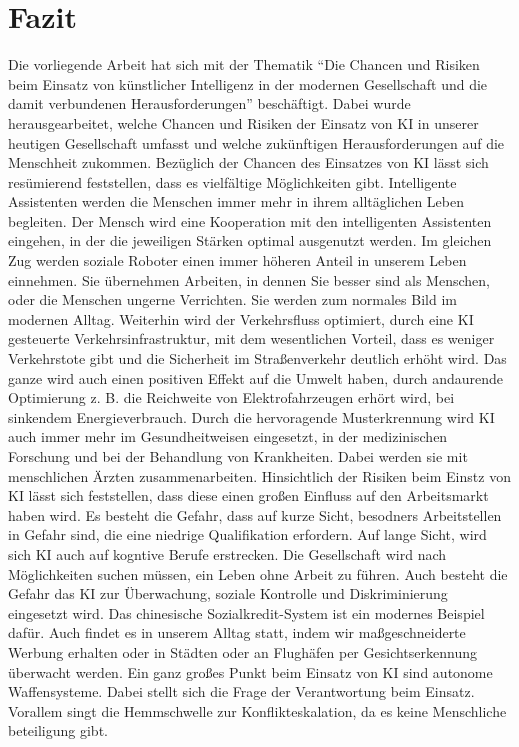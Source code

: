 \newpage
\section{Fazit}\label{Fazit}
Die vorliegende Arbeit hat sich mit der Thematik \enquote{Die Chancen und Risiken beim Einsatz von künstlicher Intelligenz in der modernen Gesellschaft und die damit verbundenen Herausforderungen}
beschäftigt. Dabei wurde herausgearbeitet, welche Chancen und Risiken der Einsatz von \ac{KI} in unserer heutigen Gesellschaft umfasst und welche zukünftigen Herausforderungen
auf die Menschheit zukommen.
Bezüglich der Chancen des Einsatzes von \ac{KI} lässt sich resümierend feststellen, dass es vielfältige Möglichkeiten gibt. Intelligente Assistenten werden die Menschen immer mehr in ihrem
alltäglichen Leben begleiten. Der Mensch wird eine Kooperation mit den intelligenten Assistenten eingehen, in der die jeweiligen Stärken optimal ausgenutzt werden. 
Im gleichen Zug werden soziale Roboter einen immer höheren Anteil in unserem Leben einnehmen. Sie übernehmen Arbeiten, in dennen Sie besser sind als Menschen, oder die Menschen
ungerne Verrichten. Sie werden zum normales Bild im modernen Alltag.
Weiterhin wird der Verkehrsfluss optimiert, durch eine \ac{KI} gesteuerte Verkehrsinfrastruktur, mit dem wesentlichen Vorteil, dass es weniger Verkehrstote gibt und die Sicherheit
im Straßenverkehr deutlich erhöht wird. Das ganze wird auch einen positiven Effekt auf die Umwelt haben, durch andaurende Optimierung z. B. die Reichweite von Elektrofahrzeugen 
erhört wird, bei sinkendem Energieverbrauch.
Durch die hervoragende Musterkrennung wird \ac{KI} auch immer mehr im Gesundheitweisen eingesetzt, in der medizinischen Forschung und bei der Behandlung von Krankheiten. 
Dabei werden sie mit menschlichen Ärzten zusammenarbeiten.
Hinsichtlich der Risiken beim Einstz von \ac{KI} lässt sich feststellen, dass diese einen großen Einfluss auf den Arbeitsmarkt haben wird. Es besteht die Gefahr, dass auf kurze Sicht,
besodners Arbeitstellen in Gefahr sind, die eine niedrige Qualifikation erfordern. Auf lange Sicht, wird sich \ac{KI} auch auf kogntive Berufe erstrecken. Die Gesellschaft wird nach Möglichkeiten
suchen müssen, ein Leben ohne Arbeit zu führen.
Auch besteht die Gefahr das \ac{KI} zur Überwachung, soziale Kontrolle und Diskriminierung eingesetzt wird. Das chinesische Sozialkredit-System ist ein modernes Beispiel dafür. Auch findet es
in unserem Alltag statt, indem wir maßgeschneiderte Werbung erhalten oder in Städten oder an Flughäfen per Gesichtserkennung überwacht werden.
Ein ganz großes Punkt beim Einsatz von \ac{KI} sind autonome Waffensysteme. Dabei stellt sich die Frage der Verantwortung beim Einsatz. Vorallem singt die Hemmschwelle zur Konflikteskalation, da es keine Menschliche beteiligung gibt.
